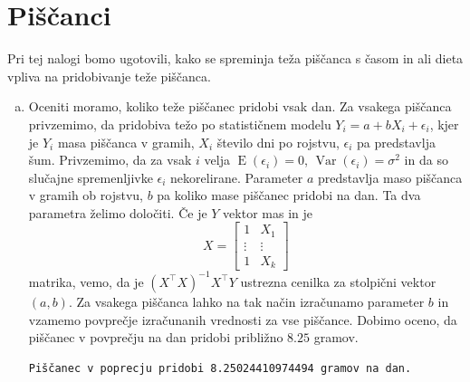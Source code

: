 \documentclass[a4paper,12pt]{article}
\theoremstyle{definition}
\theoremstyle{plain}
\DeclareMathOperator*{\E}{E}
\DeclareMathOperator*{\Var}{Var}
\begin{document}
\section{Piščanci}
Pri tej nalogi bomo ugotovili, kako se spreminja teža piščanca s časom in ali dieta vpliva na pridobivanje teže piščanca.

\begin{enumerate}[a)]
    \item Oceniti moramo, koliko teže piščanec pridobi vsak dan. Za vsakega piščanca privzemimo, da pridobiva težo po statističnem modelu $Y_i = a + b X_i + \epsilon_i$, kjer je $Y_i$ masa piščanca v gramih, $X_i$ število dni po rojstvu, $\epsilon_i$ pa predstavlja šum. Privzemimo, da za vsak $i$ velja $\E(\epsilon_i) = 0$, $\Var(\epsilon_i) = \sigma^2$ in da so slučajne spremenljivke $\epsilon_i$ nekorelirane. Parameter $a$ predstavlja maso piščanca v gramih ob rojstvu, $b$ pa koliko mase piščanec pridobi na dan. Ta dva parametra želimo določiti. Če je $Y$ vektor mas in je 
    $$
    X = \left[
        \begin{array}{cc}
            1 & X_1 \\
            \vdots & \vdots \\
            1 & X_k
        \end{array}
    \right]
    $$ 
    matrika, vemo, da je $(X^\top X)^{-1} X^\top Y$ ustrezna cenilka za stolpični  vektor $(a, b)$. Za vsakega piščanca lahko na tak način izračunamo parameter $b$ in vzamemo povprečje izračunanih vrednosti za vse piščance. Dobimo oceno, da piščanec v povprečju na dan pridobi približno $8.25$ gramov.

    \begin{verbatim}
Piščanec v poprecju pridobi 8.25024410974494 gramov na dan.
    \end{verbatim}


\end{enumerate}
\end{document}
